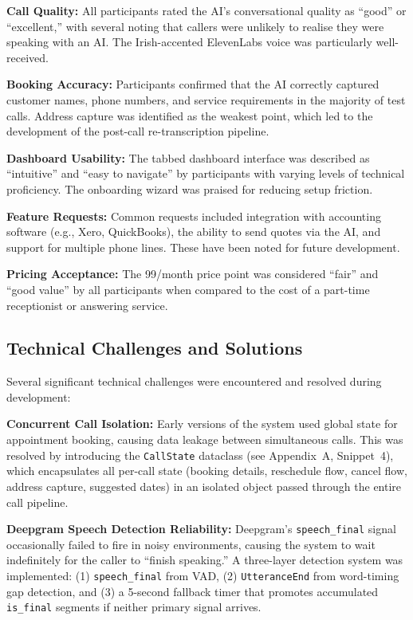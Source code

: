 \documentclass[conference]{IEEEtran}
\begin{document}
\textbf{Call Quality:} All participants rated the AI's conversational quality as ``good'' or ``excellent,'' with several noting that callers were unlikely to realise they were speaking with an AI. The Irish-accented ElevenLabs voice was particularly well-received.

\textbf{Booking Accuracy:} Participants confirmed that the AI correctly captured customer names, phone numbers, and service requirements in the majority of test calls. Address capture was identified as the weakest point, which led to the development of the post-call re-transcription pipeline.

\textbf{Dashboard Usability:} The tabbed dashboard interface was described as ``intuitive'' and ``easy to navigate'' by participants with varying levels of technical proficiency. The onboarding wizard was praised for reducing setup friction.

\textbf{Feature Requests:} Common requests included integration with accounting software (e.g., Xero, QuickBooks), the ability to send quotes via the AI, and support for multiple phone lines. These have been noted for future development.

\textbf{Pricing Acceptance:} The \texteuro{}99/month price point was considered ``fair'' and ``good value'' by all participants when compared to the cost of a part-time receptionist or answering service.


\subsection{Technical Challenges and Solutions}

Several significant technical challenges were encountered and resolved during development:

\textbf{Concurrent Call Isolation:} Early versions of the system used global state for appointment booking, causing data leakage between simultaneous calls. This was resolved by introducing the \texttt{CallState} dataclass (see Appendix~A, Snippet~4), which encapsulates all per-call state (booking details, reschedule flow, cancel flow, address capture, suggested dates) in an isolated object passed through the entire call pipeline.

\textbf{Deepgram Speech Detection Reliability:} Deepgram's \texttt{speech\_final} signal occasionally failed to fire in noisy environments, causing the system to wait indefinitely for the caller to ``finish speaking.'' A three-layer detection system was implemented: (1) \texttt{speech\_final} from VAD, (2) \texttt{UtteranceEnd} from word-timing gap detection, and (3) a 5-second fallback timer that promotes accumulated \texttt{is\_final} segments if neither primary signal arrives.
\end{document}
